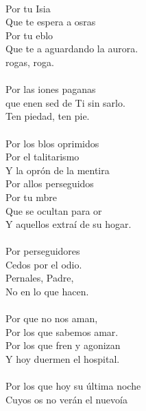 \begin{cancion}[Noche][Hakuna]%
	    \\
	Por tu Isia\\
	Que te espera a osras\\
	Por tu eblo\\
	Que te a aguardando la aurora.\\
	rogas,  roga.\\
\jump\\
	Por las iones paganas\\
	que enen sed de Ti sin sarlo.\\
	Ten piedad, ten pie.\\
\jump\\
	Por los blos oprimidos\\
	Por el talitarismo\\
	Y la oprón de la mentira\\
	Por allos perseguidos\\
	Por tu mbre\\
	Que se ocultan para or\\
	Y aquellos extraí de su hogar. \\
\jump\\
	Por  perseguidores\\
	Cedos por el odio.\\
	Pernales, Padre, \\
	No en lo que hacen.\\
\jump\\
	Por  que no nos aman,\\
	Por los que  sabemos amar.\\
	Por los que fren y agonizan\\
	Y hoy duermen el hospital.\\
\jump\\
	Por los que hoy su última noche\\
	Cuyos os no verán el nuevoía\\

\end{cancion}
